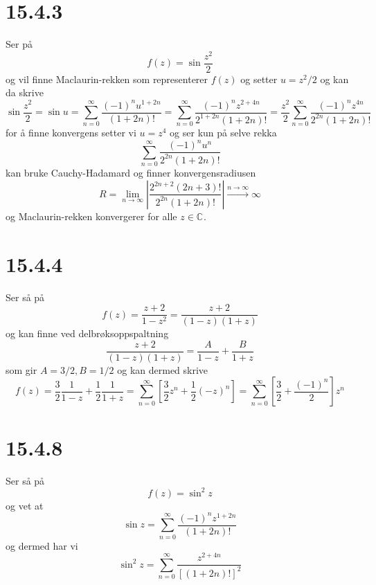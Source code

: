 \documentclass{report}
\newcommand{\M}[2]{\mathbb{#1}^{#2}}
\newcommand{\bbrack}[1]{\left[ #1 \right]}
\newcommand{\linebrack}[1]{\left| #1 \right|}
\newcommand{\limtoinf}[1]{\lim_{#1 \rightarrow \infty}}
\begin{document}
\section*{15.4.3}
Ser på
\begin{equation}
  \label{eq:10}
  f(z) = \sin \frac{z^{2}}{2}
\end{equation}
og vil finne Maclaurin-rekken som representerer $f(z)$ og setter $u = z^{2}/2$ og kan da skrive
\begin{equation}
  \label{eq:14}
  \sin \frac{z^{2}}{2} = \sin u = \sum_{n=0}^{\infty} \frac{(-1)^{n} u^{1+2n}}{(1+2n)!} = \sum_{n=0}^{\infty} \frac{(-1)^{n} z^{2+4n}}{2^{1+2n}(1+2n)!} = \frac{z^{2}}{2} \sum_{n=0}^{\infty} \frac{(-1)^{n} z^{4n}}{2^{2n}(1+2n)!}
\end{equation}
for å finne konvergens setter vi $u = z^{4}$ og ser kun på selve rekka
\begin{equation}
  \label{eq:16}
  \sum_{n=0}^{\infty} \frac{(-1)^{n}u^{n}}{2^{2n}(1+2n)!}
\end{equation}
kan bruke Cauchy-Hadamard og finner konvergensradiusen
\begin{equation}
  \label{eq:17}
  R = \limtoinf{n} \linebrack{ \frac{ 2^{2n + 2} (2n + 3)! }{ 2^{2n}(1+2n)! } } \xrightarrow{n \to \infty} \infty
\end{equation}
og Maclaurin-rekken konvergerer for alle $z\in \M{C}{}$.


\section*{15.4.4}
Ser så på
\begin{equation}
  \label{eq:18}
  f(z) = \frac{z+2}{1-z^{2}} = \frac{z+2}{(1-z)(1+z)}
\end{equation}
og kan finne ved delbrøksoppspaltning
\begin{equation}
  \label{eq:11}
  \frac{z+2}{(1-z)(1+z)} = \frac{A}{1-z} + \frac{B}{1+z}
\end{equation}
som gir $A = 3/2, B = 1/2$ og kan dermed skrive
\begin{equation}
  \label{eq:12}
  f(z) = \frac{3}{2} \frac{1}{1-z} + \frac{1}{2} \frac{1}{1+z} = \sum_{n=0}^{\infty} \bbrack{ \frac{3}{2} z^{n} + \frac{1}{2} (-z)^{n} } = \sum_{n=0}^{\infty} \bbrack{ \frac{3}{2} + \frac{(-1)^{n}}{2} }z^{n}
\end{equation}



\section*{15.4.8}
Ser så på
\begin{equation}
  \label{eq:13}
  f(z) = \sin^{2} z
\end{equation}
og vet at
\begin{equation}
  \label{eq:23}
  \sin z = \sum_{n=0}^{\infty} \frac{ (-1)^{n} z^{1+2n} }{(1+2n)!}
\end{equation}
og dermed har vi
\begin{equation}
  \label{eq:24}
  \sin^{2} z = \sum_{n=0}^{\infty} \frac{z^{2 + 4n}}{\bbrack{ (1+2n)! }^{2}}
\end{equation}
\end{document}
